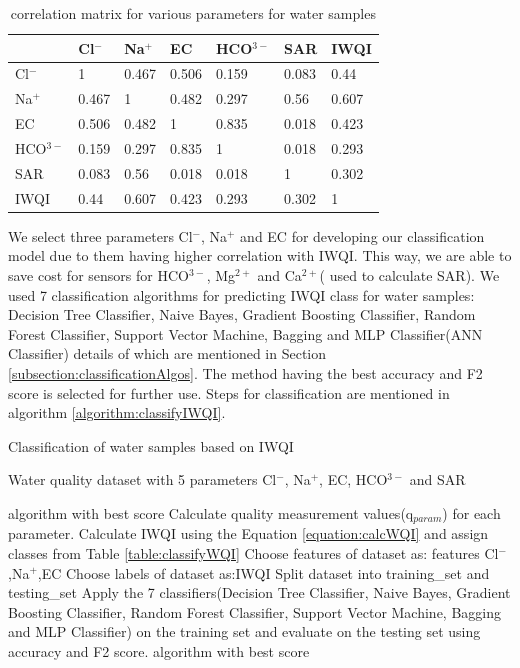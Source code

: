\begin{table}[h!]
    \centering
    \begin{tabular}{|l|l|l|l|l|l|l|}
    \hline
         & Cl$^-$ & Na$^+$ & EC & HCO$^{3-}$ & SAR & IWQI \\ \hline
        Cl$^-$ & 1 & 0.467 & 0.506 & 0.159 & 0.083 & 0.44 \\ \hline
        Na$^+$ & 0.467 & 1 & 0.482 & 0.297 & 0.56 & 0.607 \\ \hline
        EC & 0.506 & 0.482 & 1 & 0.835 & 0.018 & 0.423 \\ \hline
        HCO$^{3-}$ & 0.159 & 0.297 & 0.835 & 1 & 0.018 & 0.293 \\ \hline
        SAR & 0.083 & 0.56 & 0.018 & 0.018 & 1 & 0.302 \\ \hline
        IWQI & 0.44 & 0.607 & 0.423 & 0.293 & 0.302 & 1 \\ \hline
    \end{tabular}
    \caption{correlation matrix for various parameters for water samples}
    \label{table:correlationMatrixOfIons&IWQI}
\end{table}

We select three parameters Cl$^-$, Na$^+$ and EC for developing our classification model due to them having higher correlation with IWQI. This way, we are able to save cost for sensors for HCO$^{3-}$, Mg$^{2+}$ and Ca$^{2+}$( used to calculate SAR). We used 7 classification algorithms for predicting IWQI class for water samples: Decision Tree Classifier, Naive Bayes, Gradient Boosting Classifier, Random Forest Classifier, Support Vector Machine, Bagging  and MLP Classifier(ANN Classifier) details of which are mentioned in Section \ref{subsection:classificationAlgos}. The method having the best accuracy and F2 score is selected for further use. Steps for classification are mentioned in algorithm \ref{algorithm:classifyIWQI}.

\begin{algorithm}[H]
	\caption{Classification of water samples based on IWQI}
	\begin{algorithmic}[1]
		\label{stackedautoencoderAlgorithm}
		\renewcommand{\algorithmicrequire}{\textbf{Input:}}
		\renewcommand{\algorithmicensure}{\textbf{Output:}}
		\REQUIRE Water quality dataset with 5 parameters Cl$^-$, Na$^+$, EC, HCO$^{3-}$ and SAR
		
		\ENSURE  algorithm with best score       
        \STATE Calculate quality measurement values(q$_{param}$) for each parameter.
        \STATE Calculate IWQI using the Equation \ref{equation:calcWQI} and assign classes from Table \ref{table:classifyWQI}
        \STATE Choose features of dataset as: features \xleftarrow{} Cl$^-$,Na$^+$,EC 
        \STATE Choose labels of dataset as:IWQI
        \STATE Split dataset into training\_set and testing\_set
        \STATE Apply the 7 classifiers(Decision Tree Classifier, Naive Bayes, Gradient Boosting Classifier, Random Forest Classifier, Support Vector Machine, Bagging  and MLP Classifier) on the training set and evaluate on the testing set using accuracy and F2 score.
        \RETURN algorithm with best score
	\end{algorithmic} 
	\label{algorithm:classifyIWQI}
\end{algorithm}

